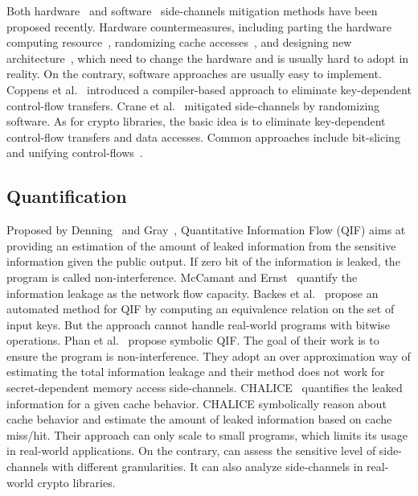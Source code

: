 Both hardware~\cite{Page2005PartitionedCA,
Wang:2007:NCD:1250662.1250723,Zhang:2015:HDL:2775054.2694372,Li:2014:SLH:2541940.2541947,
236344, 236334} and software~\cite{shih2017t,Coppens:2009:PMT:1607723.1608124,
brickell2006software,crane2015thwarting, 197207} side-channels mitigation methods have
been proposed recently. Hardware countermeasures, including parting the hardware
computing resource~\cite{Page2005PartitionedCA}, randomizing cache
accesses~\cite{Wang:2007:NCD:1250662.1250723, 236344}, and designing new
architecture~\cite{tiwari2011crafting}, which need to change the hardware and is
usually hard to adopt in reality. On the contrary, software approaches are
usually easy to implement. Coppens et
al.~\cite{Coppens:2009:PMT:1607723.1608124} introduced a compiler-based approach
to eliminate key-dependent control-flow transfers. Crane et
al.~\cite{crane2015thwarting} mitigated side-channels by randomizing software.
As for crypto libraries, the basic idea is to eliminate key-dependent
control-flow transfers and data accesses. Common approaches include
bit-slicing~\cite{konighofer2008fast,rebeiro2006bitslice} and unifying
control-flows~\cite{Coppens:2009:PMT:1607723.1608124}.

\subsection{Quantification}

Proposed by Denning~\cite{robling1982cryptography} and Gray~\cite{gray1992toward}, 
Quantitative Information Flow (QIF) aims at providing an estimation of the amount of leaked
information from the sensitive information given the public output. If zero bit
of the information is leaked, the program is called non-interference. McCamant
and Ernst~\cite{McCamantE2008} quantify the information leakage as the network
flow capacity. Backes et al.~\cite{5207642} propose an automated method for QIF
by computing an equivalence relation on the set of input keys. But the approach
cannot handle real-world programs with bitwise operations. 
Phan et
al.~\cite{Phan:2012:SQI:2382756.2382791} propose symbolic QIF. The goal of their
work is to ensure the program is non-interference. They adopt an over
approximation way of estimating the total information leakage and their method
does not work for secret-dependent memory access side-channels.
CHALICE~\cite{Chattopadhyay:2017:QIL:3127041.3127044} quantifies the leaked
information for a given cache behavior. CHALICE symbolically reason about cache
behavior and estimate the amount of leaked information based on cache miss/hit.
Their approach can only scale to small programs, which limits its usage in
real-world applications. On the contrary, \tool{} can assess the sensitive level
of side-channels with different granularities. It can also analyze side-channels
in real-world crypto libraries.

